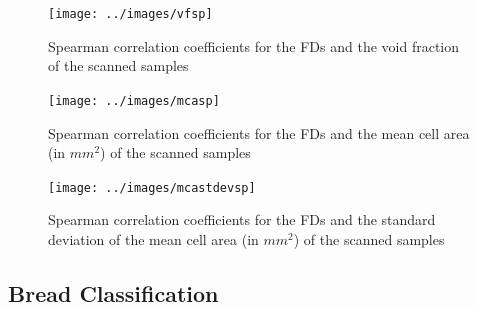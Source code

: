 


\begin{figure}[htb]
\centering
\texttt{[image: ../images/vfsp]}
\caption{Spearman correlation coefficients for the FDs and the void fraction of the scanned samples}
\label{fig:corrVF}
\end{figure}

\begin{figure}[htb]
\centering
\texttt{[image: ../images/mcasp]}
\caption{Spearman correlation coefficients for the FDs and the mean cell area (in $mm^{2}$) of the scanned samples}
\label{fig:corrMCA}
\end{figure}

\begin{figure}[htb]
\centering
\texttt{[image: ../images/mcastdevsp]}
\caption{Spearman correlation coefficients for the FDs and the standard deviation of the mean cell area (in $mm^{2}$) of the scanned samples}
\label{fig:corrMCAstdev}
\end{figure}





\subsection{Bread Classification}
\label{sec:10}

